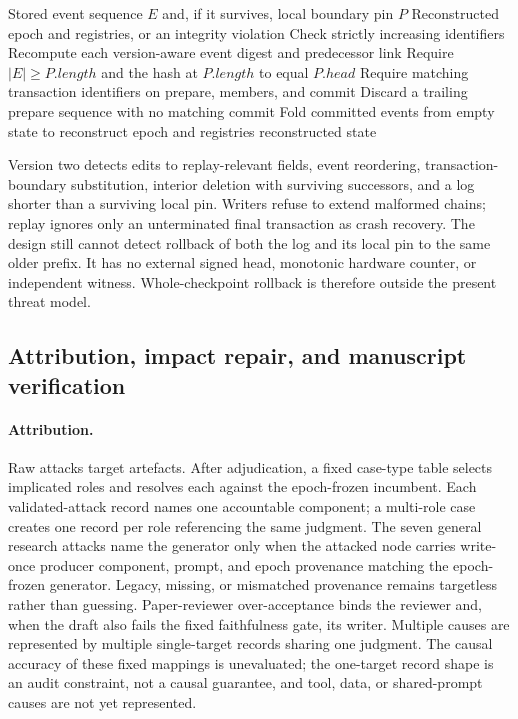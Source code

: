 \begin{algorithm}[htbp]
\caption{Deterministic resume projection}
\begin{algorithmic}[1]
\Require Stored event sequence $E$ and, if it survives, local boundary pin $P$
\Ensure Reconstructed epoch and registries, or an integrity violation
\State Check strictly increasing identifiers
\State Recompute each version-aware event digest and predecessor link
  \State Require $|E|\geq P.length$ and the hash at $P.length$ to equal $P.head$
\EndIf
\State Require matching transaction identifiers on prepare, members, and commit
\State Discard a trailing prepare sequence with no matching commit
\State Fold committed events from empty state to reconstruct epoch and registries
\State \Return reconstructed state
\end{algorithmic}
\end{algorithm}

Version two detects edits to replay-relevant fields, event reordering,
transaction-boundary substitution, interior deletion with surviving
successors, and a log shorter than a surviving local pin. Writers refuse to
extend malformed chains; replay ignores only an unterminated final
transaction as crash recovery. The design still cannot detect rollback of
both the log and its local pin to the same older prefix. It has no external
signed head, monotonic hardware counter, or independent witness.
Whole-checkpoint rollback is therefore outside the present threat model.

\subsection{Attribution, impact repair, and manuscript verification}\label{sec:appendix:algorithms}

\paragraph{Attribution.}
Raw attacks target artefacts. After adjudication, a fixed case-type table
selects implicated roles and resolves each against the epoch-frozen
incumbent. Each validated-attack record names one accountable component; a
multi-role case creates one record per role referencing the same judgment.
The seven general research attacks name the generator only when the attacked
node carries write-once producer component, prompt, and epoch provenance
matching the epoch-frozen generator. Legacy, missing, or mismatched provenance
remains targetless rather than guessing. Paper-reviewer over-acceptance binds
the reviewer and, when the draft also fails the fixed faithfulness gate, its
writer. Multiple causes are represented by multiple single-target records
sharing one judgment. The causal accuracy of these fixed mappings is
unevaluated; the one-target record shape is an audit constraint, not a causal
guarantee, and tool, data, or shared-prompt causes are not yet represented.


